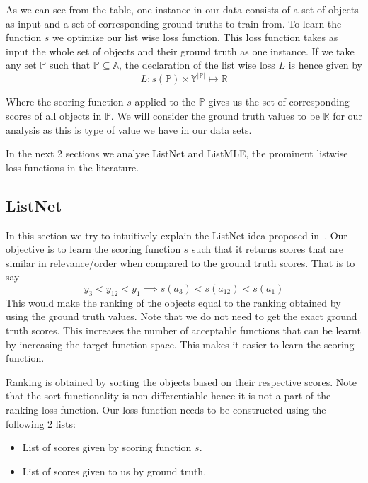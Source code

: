 \documentclass[11pt]{report}
\begin{document}
As we can see from the table,  one instance in our data consists of a set of objects as input and a set of corresponding ground truths to train from.
To learn the function $s$ we optimize our list wise loss function.
This loss function takes as input the whole set of objects and their ground truth as one instance.
If we take any set $\mathbb{P}$ such that $\mathbb{P} \subseteq \mathbb{A}$,  the declaration of the list wise loss $L$ is hence given by
\begin{equation}
L : s(\mathbb{P}) \times \mathbb{Y}^{|\mathbb{P}|} \mapsto \mathbb{R}
\end{equation}

Where the scoring function $s$ applied to the $\mathbb{P}$ gives us the set of corresponding scores of all objects in $\mathbb{P}$.
We will consider the ground truth values to be $\mathbb{R}$ for our analysis as this is type of value
we have in our data sets.

In the next 2 sections we analyse ListNet and ListMLE,  the prominent listwise loss functions in the literature.

\subsection{ListNet}

In this section we try to intuitively explain the ListNet idea proposed in~\cite{listwisebetter}.
Our objective is to learn the scoring function $s$ such that it returns scores that are similar in relevance/order when compared to the ground truth scores.
That is to say
$$
y_3 < y_{12} < y_1 \implies s(a_3) < s(a_{12}) < s(a_1)
$$
This would make the ranking of the objects equal to the ranking obtained by using the ground truth values.
Note that we do not need to get the exact ground truth scores.
This increases the number of acceptable functions that can be learnt by increasing the target function space.
This makes it easier to learn the scoring function.

Ranking is obtained by sorting the objects based on their respective scores.
Note that the sort functionality is non differentiable hence it is not a 
part of the ranking loss function.
Our loss function needs to be constructed using the following 2 lists:
\begin{itemize}
\item List of scores given by scoring function $s$.
\item List of scores given to us by ground truth.
\end{itemize}
\end{document}
